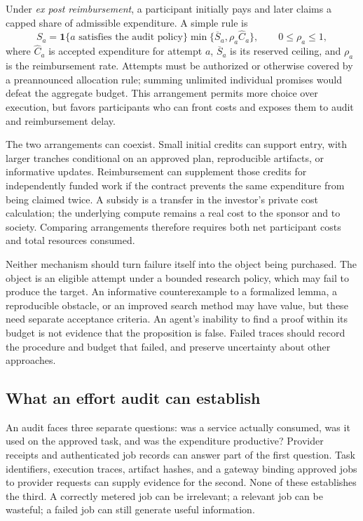 \documentclass[11pt,a4paper]{article}
\newcommand{\I}{\mathbf{1}}
\begin{document}
Under \emph{ex post reimbursement}, a participant initially pays and later claims a capped share of admissible expenditure. A simple rule is
\[
 S_a=\I\{a\text{ satisfies the audit policy}\}
       \min\{\overline S_a,\rho_a\widehat C_a\},
 \qquad 0\leq\rho_a\leq1,
\]
where $\widehat C_a$ is accepted expenditure for attempt $a$, $\overline S_a$ is its reserved ceiling, and $\rho_a$ is the reimbursement rate. Attempts must be authorized or otherwise covered by a preannounced allocation rule; summing unlimited individual promises would defeat the aggregate budget. This arrangement permits more choice over execution, but favors participants who can front costs and exposes them to audit and reimbursement delay.

The two arrangements can coexist. Small initial credits can support entry, with larger tranches conditional on an approved plan, reproducible artifacts, or informative updates. Reimbursement can supplement those credits for independently funded work if the contract prevents the same expenditure from being claimed twice. A subsidy is a transfer in the investor's private cost calculation; the underlying compute remains a real cost to the sponsor and to society. Comparing arrangements therefore requires both net participant costs and total resources consumed.

Neither mechanism should turn failure itself into the object being purchased. The object is an eligible attempt under a bounded research policy, which may fail to produce the target. An informative counterexample to a formalized lemma, a reproducible obstacle, or an improved search method may have value, but these need separate acceptance criteria. An agent's inability to find a proof within its budget is not evidence that the proposition is false. Failed traces should record the procedure and budget that failed, and preserve uncertainty about other approaches.

\subsection{What an effort audit can establish}
An audit faces three separate questions: was a service actually consumed, was it used on the approved task, and was the expenditure productive? Provider receipts and authenticated job records can answer part of the first question. Task identifiers, execution traces, artifact hashes, and a gateway binding approved jobs to provider requests can supply evidence for the second. None of these establishes the third. A correctly metered job can be irrelevant; a relevant job can be wasteful; a failed job can still generate useful information.
\end{document}
